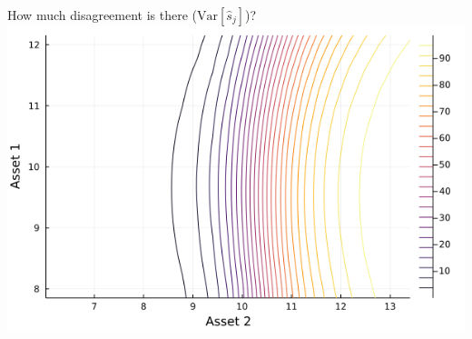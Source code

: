 \documentclass[
  ignorenonframetext,
]{beamer}
\begin{document}
\begin{frame}{How much disagreement is there
(\(\text{Var}[\hat s_j]\))?}
\includegraphics[width=0.4\paperheight]{complexity_files/figure-beamer/unnamed-chunk-18-4}
\end{frame}
\end{document}
